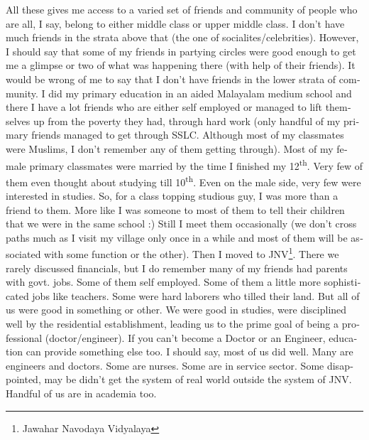 \begin{english}
All these gives me access to a varied set of friends and community of people who are all, I say, 
belong to either middle class or upper middle class. I don't have much friends in the strata above 
that (the one of socialites/celebrities). However, I should say that some of my friends in partying circles 
were good enough to get me a glimpse or two of what was happening there (with help of their friends). 
It would be wrong of me to say that I don't have friends in the lower strata of community. I did my primary education 
in an aided Malayalam medium school and there I have a lot friends who are either self employed 
or managed to lift themselves up from the poverty they had, through hard work (only handful of my 
primary friends managed to get through SSLC. Although most of my classmates were Muslims, I don't 
remember any of them getting through). Most of my female primary classmates were married by the time 
I finished my 12\textsuperscript{th}. Very few of them even thought about studying till 10\textsuperscript{th}. Even on the male side, 
very few were interested in studies. So, for a class topping studious guy, I was more than a friend 
to them. More like I was someone to most of them to tell their children that we were in the same school :) Still 
I meet them occasionally (we don't cross paths much as I visit my village only once in a while 
and most of them will be associated with some function or the other). Then I moved to JNV\footnote{Jawahar Navodaya Vidyalaya}. There we rarely discussed financials, but I do remember many of my friends had
parents with govt. jobs. Some of them self employed. Some of them a little more sophisticated jobs
like teachers. Some were hard laborers who tilled their land. But all of us were good in something 
or other. We were good in
studies, were disciplined well by the residential establishment, leading us to the prime goal of 
being a professional (doctor/engineer). If you can't become a Doctor or an Engineer, education can provide something else too. I should say, most of us did well. Many are engineers and doctors. Some are nurses. 
Some are in service sector. Some disappointed, may be didn't get the system of real world outside 
the system of JNV. Handful of us are in academia too. 


\end{english}
